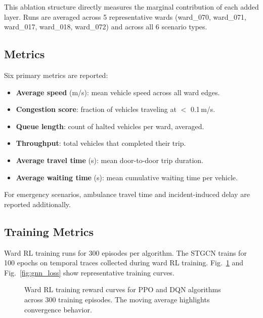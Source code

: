 \documentclass[conference]{IEEEtran}
\begin{document}
This ablation structure directly measures the marginal contribution of each
added layer. Runs are averaged across 5 representative wards (ward\_070,
ward\_071, ward\_017, ward\_018, ward\_072) and across all 6 scenario types.

\subsection{Metrics}

Six primary metrics are reported:

\begin{itemize}
\item \textbf{Average speed} (m/s): mean vehicle speed across all ward edges.
\item \textbf{Congestion score}: fraction of vehicles traveling at $<$ 0.1\,m/s.
\item \textbf{Queue length}: count of halted vehicles per ward, averaged.
\item \textbf{Throughput}: total vehicles that completed their trip.
\item \textbf{Average travel time} (s): mean door-to-door trip duration.
\item \textbf{Average waiting time} (s): mean cumulative waiting time per vehicle.
\end{itemize}

For emergency scenarios, ambulance travel time and incident-induced delay
are reported additionally.

\subsection{Training Metrics}

Ward RL training runs for 300 episodes per algorithm. The STGCN trains for
100 epochs on temporal traces collected during ward RL training. Fig.~\ref{fig:reward_curves}
and Fig.~\ref{fig:gnn_loss} show representative training curves.

\begin{figure}[!t]
\centering
{}
\caption{Ward RL training reward curves for PPO and DQN algorithms
across 300 training episodes. The moving average highlights convergence
behavior.}
\label{fig:reward_curves}
\end{figure}
\end{document}
